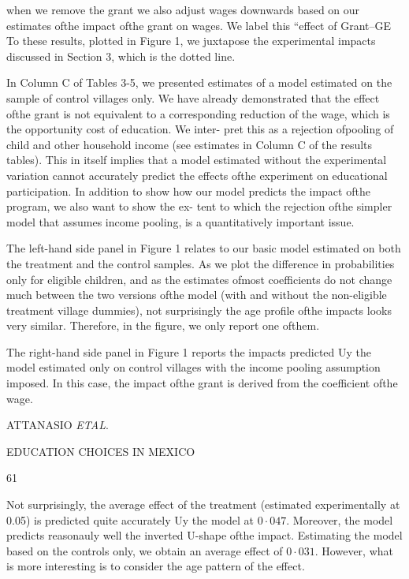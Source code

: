 when we remove the grant we also adjust wages downwards based on our estimates ofthe impact ofthe grant on wages. We label this ``effect of Grant--GE To these results, plotted in Figure 1, we juxtapose the experimental impacts discussed in Section 3, which is the dotted line.

In Column $\mathrm{C}$ of Tables 3-5, we presented estimates of a model estimated on the sample of control villages only. We have already demonstrated that the effect ofthe grant is not equivalent to a corresponding reduction of the wage, which is the opportunity cost of education. We inter- pret this as a rejection ofpooling of child and other household income (see estimates in Column $\mathrm{C}$ of the results tables). This in itself implies that a model estimated without the experimental variation cannot accurately predict the effects ofthe experiment on educational participation. In addition to show how our model predicts the impact ofthe program, we also want to show the ex- tent to which the rejection ofthe simpler model that assumes income pooling, is a quantitatively important issue.

The left-hand side panel in Figure 1 relates to our basic model estimated on both the treatment and the control samples. As we plot the difference in probabilities only for eligible children, and as the estimates ofmost coefficients do not change much between the two versions ofthe model (with and without the non-eligible treatment village dummies), not surprisingly the age profile ofthe impacts looks very similar. Therefore, in the figure, we only report one ofthem.

The right-hand side panel in Figure 1 reports the impacts predicted Uy the model estimated only on control villages with the income pooling assumption imposed. In this case, the impact ofthe grant is derived from the coefficient ofthe wage.

ATTANASIO {\it ETAL}.

EDUCATION CHOICES IN MEXICO

61

Not surprisingly, the average effect of the treatment (estimated experimentally at 0.05) is predicted quite accurately Uy the model at $0\cdot 047$. Moreover, the model predicts reasonauly well the inverted $\mathrm{U}$-shape ofthe impact. Estimating the model based on the controls only, we obtain an average effect of $0\cdot 031$. However, what is more interesting is to consider the age pattern of the effect.

